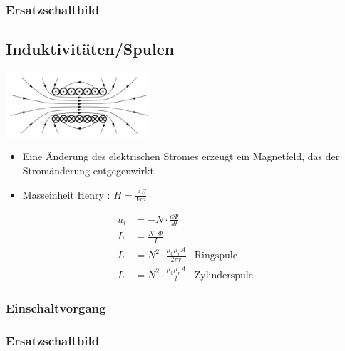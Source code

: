 \subsubsection{Ersatzschaltbild}


\subsection{Induktivitäten/Spulen}
\begin{multicols}{2}
	\includegraphics[width=0.4\textwidth]{pictures/induktivitaet}
	\columnbreak
	\begin{itemize}
  		\item Eine Änderung des elektrischen Stromes erzeugt ein Magnetfeld, das der
  			Stromänderung entgegenwirkt
  		\item Masseinheit Henry : $H=\frac{AS}{Vm}$
	\end{itemize}
	\begin{align*}
  		u_{i} &=-N\cdot\frac{d\Phi}{dt}\\
  		L &=\frac{N\cdot\Phi}{I} \\
  		L &=N^2\cdot\frac{\mu_{0}\mu_{r}A}{2\pi r} & \text{Ringspule} \\
  		L &=N^2\cdot\frac{\mu_{0}\mu_{r}A}{l} & \text{Zylinderspule}
	\end{align*}
\end{multicols}

\subsubsection{Einschaltvorgang}


\subsubsection{Ersatzschaltbild}


